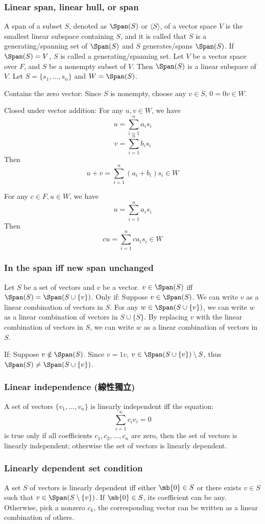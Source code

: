 \documentclass[a4paper,12pt]{report}
\begin{document}
\subsubsection{Linear span, linear hull, or span}
A span of a subset $S$, denoted as $\Span(S)$ or $\langle S\rangle$, of a vector space $V$ is the smallest linear subspace containing $S$, and it is called that $S$ is a generating/spanning set of $\Span(S)$ and $S$ generates/spans $\Span(S)$. If $\Span(S)=V$, $S$ is called a generating/spanning set.
Let $V$ be a vector space over $F$, and $S$ be a nonempty subset of $V$. Then $\Span(S)$ is a linear subspace of $V$.
\bpr
Let $S=\{s_1,\ldots,s_n\}$ and $W=\Span(S)$.
\bit
\item Contains the zero vector: Since $S$ is nonempty, choose any $v\in S$, $0=0v\in W$.
\item Closed under vector addition: For any $u,v\in W$, we have
\[u=\sum_{i=1}^na_is_i\]
\[v=\sum_{i=1}^nb_is_i\]
Then
\[u+v=\sum_{i=1}^n(a_i+b_i)s_i\in W\]
\item For any $c\in F,u\in W$, we have
\[u=\sum_{i=1}^na_is_i\]
Then
\[cu=\sum_{i=1}^nca_is_i\in W\]
\eit
\epr
\subsubsection{In the span iff new span unchanged}
Let $S$ be a set of vectors and $v$ be a vector. $v\in\Span(S)$ iff $\Span(S)=\Span(S\cup\{v\})$.
\bpr
Only if: Suppose $v\in\Span(S)$. We can write $v$ as a linear combination of vectors in $S$. For any $w\in\Span(S\cup\{v\})$, we can write $w$ as a linear combination of vectors in $S\cup\{S\}$. By replacing $v$ with the linear combination of vectors in $S$, we can write $w$ as a linear combination of vectors in $S$.

If: Suppose $v\notin\Span(S)$. Since $v=1v$, $v\in\Span(S\cup\{v\})\setminus S$, thus $\Span(S)\ne\Span(S\cup\{v\})$.
\epr
\subsubsection{Linear independence (線性獨立)}
A set of vectors \(\{v_1,\ldots,v_n\}\) is linearly independent iff the equation:
\[\sum_{i=1}^nc_iv_i=0 \]
is true only if all coefficients \(c_1,c_2, \dots,c_n\) are zero, then the set of vectors is linearly independent; otherwise the set of vectors is linearly dependent.
\subsubsection{Linearly dependent set condition}
A set $S$ of vectors is linearly dependent iff either $\mb{0}\in S$ or there exists $v\in S$ such that $v\in\Span(S\setminus\{v\})$.
\bpr
If $\mb{0}\in S$, its coefficient can be any. Otherwise, pick a nonzero $c_k$, the corresponding vector can be written as a linear combination of others.
\epr
\end{document}
